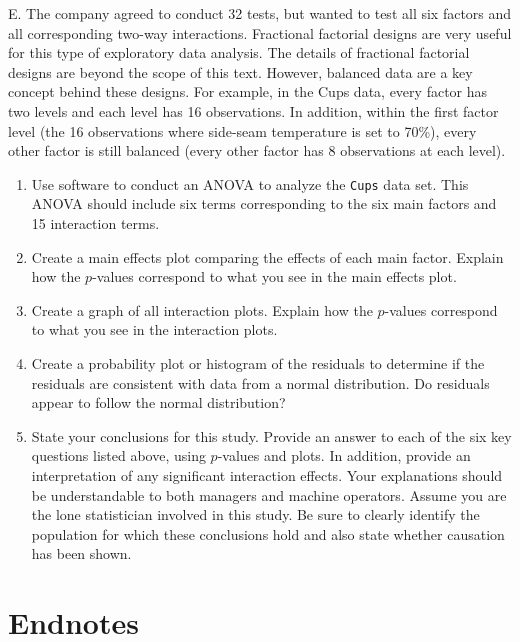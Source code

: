\documentclass[
]{report}
\newcounter{excount}
\renewcommand{\theexcount}{E\arabic{excount}}
\begin{document}
\begin{list}{\theexcount.}{ \setlength{\itemsep}{1.2em}}
The company agreed to conduct 32 tests, but wanted to test all six factors and all corresponding two-way interactions. Fractional factorial designs are very useful for this type of exploratory data analysis. The details of fractional factorial designs are beyond the scope of this text. However, balanced data are a key concept behind these designs. For example, in the Cups data, every factor has two levels and each level has 16 observations. In addition, within the first factor level (the 16 observations where side-seam temperature is set to 70\%), every other factor is still balanced (every other factor has 8 observations at each level).

  \begin{enumerate}
    \item Use software to conduct an ANOVA to analyze the \texttt{Cups} data set. This ANOVA should include six terms corresponding to the six main factors and 15 interaction terms.
    \item Create a main effects plot comparing the effects of each main factor. Explain how the $p$-values correspond to what you see in the main effects plot.
    \item Create a graph of all interaction plots. Explain how the $p$-values correspond to what you see in the interaction plots.
    \item Create a probability plot or histogram of the residuals to determine if the residuals are consistent with data from a normal distribution. Do residuals appear to follow the normal distribution?
    \item State your conclusions for this study. Provide an answer to each of the six key questions listed above, using $p$-values and plots. In addition, provide an interpretation of any significant interaction effects. Your explanations should be understandable to both managers and machine operators. Assume you are the lone statistician involved in this study. Be sure to clearly identify the population for which these conclusions hold and also state whether causation has been shown.
  \end{enumerate}

\end{list}

\hypertarget{endnotes-2}{%
\section*{\texorpdfstring{\textbf{Endnotes}}{Endnotes}}\label{endnotes-2}}
\end{document}
